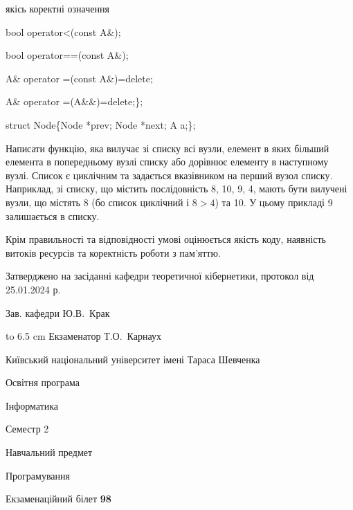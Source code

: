 \documentclass[12pt, ukrainian]{article}
\begin{document}
{\quad  якісь коректні означення 

\quad  bool operator<(const A\&); 

\quad  bool operator==(const A\&); 

\quad A\& operator =(const A\&)=delete; 

\quad  A\& operator =(A\&\&)=delete;\};

struct Node\{Node *prev; Node *next; A a;\};

Написати функцію, яка вилучає зі списку всі вузли, елемент в яких більший елемента в попередньому вузлі списку або дорівнює елементу в наступному вузлі. Список є циклічним та задається вказівником на перший вузол списку. Наприклад, зі списку, що містить послідовність 8, 10, 9, 4, мають бути вилучені вузли, що містять 8 (бо список циклічний і $8>4$) та 10. У цьому прикладі 9 залишається в списку.

Крім правильності та відповідності умові оцінюється якість коду, наявність витоків ресурсів та коректність роботи з пам'яттю. 

}
{\smallskip\smallskip \begin {scriptsize} Затверджено на засіданні кафедри теоретичної кібернетики, протокол   від   25.01.2024 р.\par\smallskip\smallskip\smallskip\smallskip
{\parbox {6.5 cm} {Зав. кафедри \dotfill Ю.В.~Крак}}\hspace {0.7cm} {\hbox to 6.5 cm { Екзаменатор \dotfill Т.О.~Карнаух}} \end{scriptsize}}
\newpage
{{\begin {scriptsize}\par
{ \center  Київський національний університет імені Тараса Шевченка \par}
{\parbox {5 cm}{Освітня програма \hfill}{\parbox {7 cm}{Інформатика\hfill}}\parbox {6 cm}{\hfill Семестр 2}}\par
{\parbox {5 cm} {Навчальний предмет \hfill}\parbox {7 cm}{Програмування \hfill}\parbox {6cm}{\hfill}\par}\vspace{-15pt} \end{scriptsize}}{\center Екзаменаційний білет \No \textbf { 98 }\par}}
\end{document}
